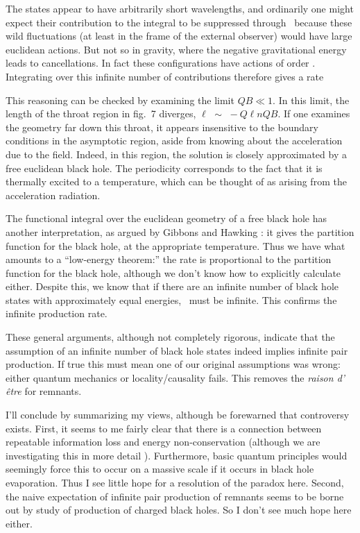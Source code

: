 The states appear to have arbitrarily short wavelengths, and ordinarily
one might expect their contribution to the integral to be suppressed
through \bhrate\ because these wild fluctuations (at least in the frame
of the external observer) would have large euclidean actions. But not so
in gravity, where the negative gravitational energy leads to
cancellations. In fact these configurations have actions of order
\bhact. Integrating over this infinite number of contributions therefore
gives a rate
%
\eqn{}
%

This reasoning can be checked by examining the limit ${QB}\ll{1}$. In
this limit, the length of the throat region in fig.~7 diverges,
${\ell}\,\,{\sim}\,\,{-}
{Q}{\ell}{n}{Q}{B}$. If one examines the geometry far down this throat,
it appears insensitive to the boundary conditions in the asymptotic
region, aside from knowing about the acceleration due to the field.
Indeed, in this
region, the solution is closely approximated by a free euclidean black
hole. The periodicity corresponds to the fact that it is thermally
excited to a temperature,
%
\eqn{}
%
which can be thought of as arising from the acceleration radiation.

The functional integral over the euclidean geometry of a
free black hole
has another
interpretation, as argued by Gibbons and Hawking : it gives
the partition function for the black hole,
%
\eqn{}
%
at the appropriate temperature.  Thus we have what amounts to a ``low-energy
theorem:''  the rate is proportional to the partition function for the
black hole, although we don't know how to explicitly calculate either.
Despite this,
we know that if there are an infinite number of black
hole states with approximately equal energies, \ten\ must be infinite.
This confirms the infinite production rate.

These general arguments, although not completely rigorous, indicate that
the assumption of an infinite number of black hole states indeed implies
infinite pair production. If true this must mean one of our original
assumptions was wrong: either quantum mechanics or locality/causality
fails. This removes the {\it raison d' \^etre} for remnants.

I'll conclude by summarizing my views, although be forewarned that
controversy exists. First, it seems to me fairly clear that there is a
connection between repeatable information loss and energy
non-conservation (although we are investigating this in more detail
). Furthermore, basic quantum principles would seemingly
force this to occur on a massive scale if it occurs in black hole
evaporation. Thus I see little hope for a resolution of the paradox
here. Second, the  naive expectation of infinite pair production of
remnants seems to be borne out by study of production of charged black
holes. So I don't see much hope here either.

